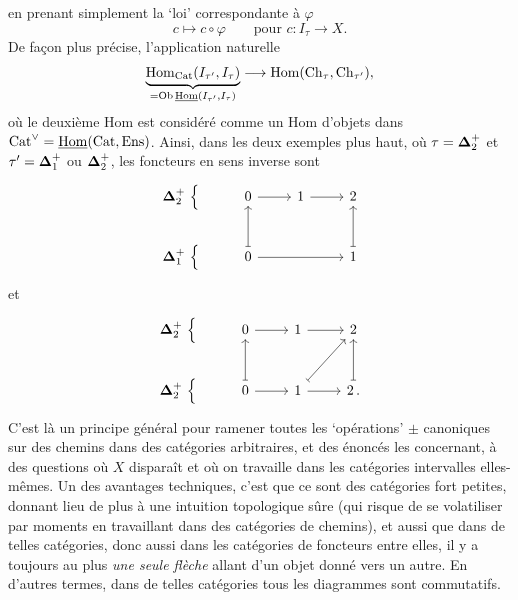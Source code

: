 en prenant simplement la ‘loi’ correspondante à $\varphi$
\[
c \longmapsto c\circ\varphi \qquad \text{pour } c : I_\tau \longrightarrow X.
\]
De façon plus précise, l'application naturelle
\[
\underbrace{\mathrm{Hom}_{\mathrm{Cat}}(I_{\tau'},I_\tau)}_{=\mathrm{Ob}\,\underline{\mathrm{Hom}}(I_{\tau'},I_\tau)} \longrightarrow \mathrm{Hom}(\mathrm{Ch}_\tau,\mathrm{Ch}_{\tau'}),
\]
où le deuxième Hom est considéré comme un Hom d'objets dans $\mathrm{Cat}^{\vee}=\underline{\mathrm{Hom}}(\mathrm{Cat},\mathrm{Ens})$. Ainsi, dans les deux exemples plus haut, où $\tau=\boldsymbol{\Delta}_2^+$ et $\tau'=\boldsymbol{\Delta}_1^+$ ou $\boldsymbol{\Delta}_2^+$, les foncteurs en sens inverse sont
\[
\begin{tikzcd}
\bDelta_2^+\ \Big\{ & 0 \arrow[r] & 1 \arrow[r] & 2 \\
\bDelta_1^+\ \Big\{ & 0 \arrow[u, mapsto] \arrow[rr] & & 1 \arrow[u, mapsto]
\end{tikzcd}
\]
et
\[
\begin{tikzcd}
\bDelta_2^+\ \Big\{ & 0 \arrow[r] & 1 \arrow[r] & 2 \\
\bDelta_2^+\ \Big\{ & 0 \arrow[u, mapsto] \arrow[r] & 1 \arrow[ur, mapsto] \arrow[r] & 2\,. \arrow[u, mapsto]
\end{tikzcd}
\]
C'est là un principe général pour ramener toutes les ‘opérations’ $\pm$ canoniques sur des chemins dans des catégories arbitraires, et des énoncés les concernant, à des questions où $X$ disparaît et où on travaille dans les catégories intervalles elles-mêmes. Un des avantages techniques, c'est que ce sont des catégories fort petites, donnant lieu de plus à une intuition topologique sûre (qui risque de se volatiliser par moments en travaillant dans des catégories de chemins), et aussi que dans de telles catégories, donc aussi dans les catégories de foncteurs entre elles, il y a toujours au plus
\textit{une seule flèche} allant d'un objet donné vers un autre. En d'autres termes, dans de telles catégories tous les diagrammes sont commutatifs.

